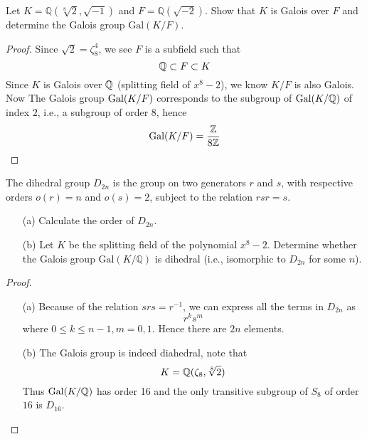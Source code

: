\begin{prob}[F2010-Q3]
    Let \(K = \mathbb{Q}(\sqrt[8]{2}, \sqrt{-1})\) and \(F = \mathbb{Q}(\sqrt{-2})\). Show that \(K\) is Galois over \(F\) and determine the Galois group \(\text{Gal}(K/F)\).
\end{prob}
\begin{proof}
    Since $\sqrt{2}=\zeta_8^4$, we see $F$ is a subfield such that 
    \begin{equation*}
        \mathbb{Q}\subset F\subset K
    \end{equation*}
    Since $K$ is Galois over $\mathbb{Q}$ (splitting field of $x^8-2$), we know $K/F$ is also Galois. Now The Galois group $\text{Gal}(K/F)$ corresponds to the subgroup of $\text{Gal}(K/\mathbb{Q})$ of index $2$, i.e., a subgroup of order $8$, hence 
    \begin{equation*}
        \text{Gal}(K/F)=\frac{\mathbb{Z}}{8\mathbb{Z}}
    \end{equation*} 


\end{proof}

\begin{prob}[F2015-Q2]
    The dihedral group \(D_{2n}\) is the group on two generators \(r\) and \(s\), with respective orders \(o(r)=n\) and \(o(s)=2\), subject to the relation \(rsr=s\).
    \begin{itemize}
        \item[(a)] Calculate the order of \(D_{2n}\).
        \item[(b)] Let \(K\) be the splitting field of the polynomial \(x^8 - 2\). Determine whether the Galois group \(\text{Gal}(K/\mathbb{Q})\) is dihedral (i.e., isomorphic to \(D_{2n}\) for some \(n\)).
    \end{itemize}
\end{prob}
\begin{proof}
    \begin{itemize}
        \item[(a)] Because of the relation $srs=r^{-1}$, we can express all the terms in $D_{2n}$ as 
        \begin{equation*}
            r^ks^m
        \end{equation*}
        where $0\leq k\leq n-1, m=0,1$. Hence there are $2n$ elements.
        \item[(b)] The Galois group is indeed diahedral, note that 
        \begin{equation*}
            K=\mathbb{Q}(\zeta_8,\sqrt[8]{2})
        \end{equation*}
        Thus $\text{Gal}(K/\mathbb{Q})$ has order 16 and the only transitive subgroup of $S_8$ of order $16$ is $D_{16}$.
    \end{itemize}
\end{proof}


